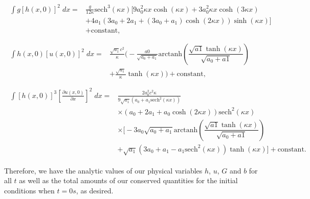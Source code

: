 \begin{align*}
\begin{split}
\int g\left[h(x,0)\right]^2 \; dx ={}& \frac{g}{12 \kappa }\text{sech}^3\left(\kappa x\right) \Bigg[9a_0^2 \kappa x \cosh\left(\kappa x\right) + 3 a_0^2 \kappa x \cosh\left(3\kappa x\right) \\ &+ 4 a_1 \left(3a_0 + 2 a_1 + \left(3a_0 + a_1\right)\cosh\left(2\kappa x\right)\right) \sinh\left(\kappa x\right)\Bigg] \\ &+ \text{constant},
\end{split}\\ \\
\begin{split}
\int h(x,0)\left[u(x,0)\right]^2 \; dx = {}& \frac{\sqrt{a_1}c^2}{\kappa} \Bigg( -\frac{a0}{\sqrt{a_0 + a_1}} \text{arctanh}\left(\dfrac{\sqrt{a1} \tanh\left(\kappa x\right)}{\sqrt{a_0 + a1}}\right)\\ &+ \frac{\sqrt{a_1}}{\kappa}\tanh\left(\kappa x\right)\Bigg)  + \text{constant},
\end{split} 
\\ \\
\begin{split}
\int \left[h(x,0)\right]^3 \left[\frac{\partial u(x,0)}{\partial x}\right]^2 \; dx = {}& \frac{2a_0^2c^2 \kappa }{9 \sqrt{a_1} \left(a_0 + a_1\text{sech}^2\left(\kappa x \right) \right)}   \\ &\times\left(a_0 + 2a_1 + a_0 \cosh\left(2\kappa x\right) \right) \text{sech}^2\left(\kappa x\right) \\&\times \Bigg[-3 a_0 \sqrt{a_0 + a_1}\text{arctanh}\left(\dfrac{\sqrt{a1} \tanh\left(\kappa x\right)}{\sqrt{a_0 + a1}}\right)  \\ &+ \sqrt{a_1}\left(3a_0 + a_1 - a_1\text{sech}^2\left(\kappa x\right)\right)\tanh(\kappa x) \Bigg]+ \text{constant}.
\end{split}
\end{align*}

Therefore, we have the analytic values of our physical variables $h$, $u$, $G$ and $b$ for all $t$ as well as the total amounts of our conserved quantities for the initial conditions when $t=0s$, as desired.

